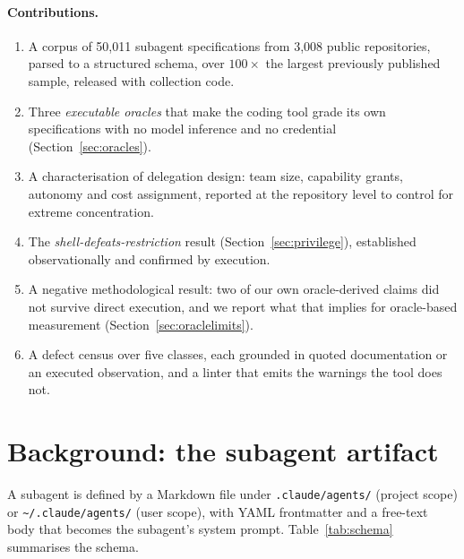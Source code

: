 \documentclass[smallextended,natbib]{svjour3}
\newcommand{\code}[1]{\texttt{\small #1}}
\begin{document}
\paragraph{Contributions.}
\begin{enumerate}\itemsep2pt
  \item A corpus of 50{,}011 subagent specifications from 3{,}008 public repositories, parsed to a
        structured schema, over $100\times$ the largest previously published sample, released
        with collection code.
  \item Three \emph{executable oracles} that make the coding tool grade its own specifications with
        no model inference and no credential (Section~\ref{sec:oracles}).
  \item A characterisation of delegation design: team size, capability grants, autonomy and cost
        assignment, reported at the repository level to control for extreme concentration.
  \item The \emph{shell-defeats-restriction} result (Section~\ref{sec:privilege}), established
        observationally and confirmed by execution.
  \item A negative methodological result: two of our own oracle-derived claims did not survive
        direct execution, and we report what that implies for oracle-based measurement
        (Section~\ref{sec:oraclelimits}).
  \item A defect census over five classes, each grounded in quoted documentation or an executed
        observation, and a linter that emits the warnings the tool does not.
\end{enumerate}

\section{Background: the subagent artifact}
\label{sec:background}

A subagent is defined by a Markdown file under \code{.claude/agents/} (project scope) or
\code{\textasciitilde/.claude/agents/} (user scope), with YAML frontmatter and a free-text body that
becomes the subagent's system prompt. Table~\ref{tab:schema} summarises the schema.
\end{document}

